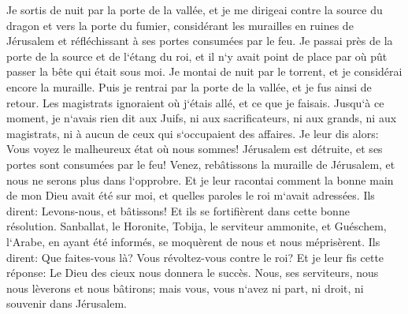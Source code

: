 \verse Je sortis de nuit par la porte de la vallée, et je me dirigeai contre la source du dragon et vers la porte du fumier, considérant les murailles en ruines de Jérusalem et réfléchissant à ses portes consumées par le feu. 
\verse Je passai près de la porte de la source et de l`étang du roi, et il n`y avait point de place par où pût passer la bête qui était sous moi. 
\verse Je montai de nuit par le torrent, et je considérai encore la muraille. Puis je rentrai par la porte de la vallée, et je fus ainsi de retour. 
\verse Les magistrats ignoraient où j`étais allé, et ce que je faisais. Jusqu`à ce moment, je n`avais rien dit aux Juifs, ni aux sacrificateurs, ni aux grands, ni aux magistrats, ni à aucun de ceux qui s`occupaient des affaires. 
\verse Je leur dis alors: Vous voyez le malheureux état où nous sommes! Jérusalem est détruite, et ses portes sont consumées par le feu! Venez, rebâtissons la muraille de Jérusalem, et nous ne serons plus dans l`opprobre. 
\verse Et je leur racontai comment la bonne main de mon Dieu avait été sur moi, et quelles paroles le roi m`avait adressées. Ils dirent: Levons-nous, et bâtissons! Et ils se fortifièrent dans cette bonne résolution. 
\verse Sanballat, le Horonite, Tobija, le serviteur ammonite, et Guéschem, l`Arabe, en ayant été informés, se moquèrent de nous et nous méprisèrent. Ils dirent: Que faites-vous là? Vous révoltez-vous contre le roi? 
\verse Et je leur fis cette réponse: Le Dieu des cieux nous donnera le succès. Nous, ses serviteurs, nous nous lèverons et nous bâtirons; mais vous, vous n`avez ni part, ni droit, ni souvenir dans Jérusalem. 

